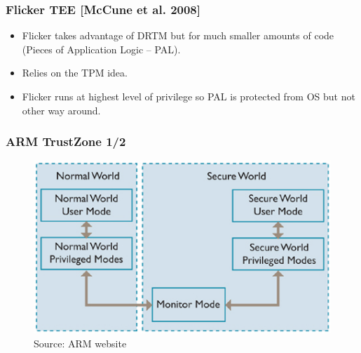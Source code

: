 \documentclass{beamer}
\begin{document}
\begin{frame}
    \frametitle{Flicker TEE [McCune et al. 2008]}

    \vfill
    \begin{itemize}
        \item Flicker takes advantage of DRTM but for much smaller amounts of code (Pieces of Application Logic -- PAL).
        \vfill
        \item Relies on the TPM idea.
        \vfill
        \item Flicker runs at highest level of privilege so PAL is protected from OS but not other way around.
    \end{itemize}
    \vfill
\end{frame}

\begin{frame}
    \frametitle{ARM TrustZone 1/2}

    \begin{figure}[htb]
        \centering
        \includegraphics[scale=.4]{assets/TrustZone-Hardware-Architecture}
        \caption{Source: ARM website}
    \end{figure}
\end{frame}
\end{document}
